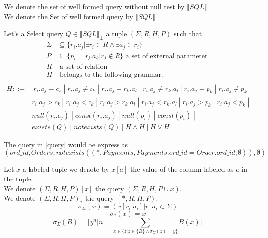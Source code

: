 \begin{mydef}
	We denote the set of well formed query without null test by $\llbracket SQL\rrbracket$
	\\We denote the Set of well formed query by $\llbracket SQL\rrbracket _\bot$
\end{mydef}

\begin{mydef}
	Let's a Select query $Q \in \llbracket SQL\rrbracket _\bot$ a tuple $(\Sigma,R,H,P)$ such that
	\begin{align*}
		\Sigma & \subseteq \{r_i.a_j | \exists r_i \in R \land \exists a_j \in r_i \} \\
		P & \subseteq \{p_i = r_j.a_k | r_j \notin R\} \mbox{ a set of external parameter.}\\
		R & \mbox{ a set of relation}\\
		H &  \mbox{ belongs to the following grammar.}\\
	\end{align*}
	\begin{align*}
		H ::= &\ r_i.a_j = c_k \; |\; r_i.a_j \neq c_k \; |\; r_i.a_j = r_k.a_l \; |\;  r_i.a_j \neq r_k.a_l \;  |\; r_i.a_j = p_k\; |\; r_i.a_j \neq p_k\; |\; 
		\\ & r_i.a_j > c_k \; |\; r_i.a_j < c_k \; |\; r_i.a_j > r_k.a_l \; |\;  r_i.a_j < r_k.a_l \;  |\; r_i.a_j > p_k\; |\; r_i.a_j < p_k\; |\;
		\\ & null(r_i.a_j) \; |\; const(r_i.a_j) \; |\; null(p_i) \; |\;  const(p_i) \;  |\; 
		\\ &  exists(Q) \; |\; notexists(Q) \; |\;  H\land H \; |\; H \lor H 
	\end{align*}
	
\end{mydef}

The query in \ref{query} would be express as $$\left( ord\_id,Orders,notexists((*,Payments,Payments.ord\_id = Order.ord\_id,\emptyset )),\emptyset \right)$$

\begin{mydef}
	Let $x$ a labeled-tuple we denote by  $x[a]$ the value of the column labeled as $a$ in the tuple.
	\\We denote $(\Sigma,R,H,P)[x]$ the query $(\Sigma,R,H,P\cup x)$.
	\\We denote $(\Sigma,R,H,P)_*$ the query $(*,R,H,P)$.
	$$ \sigma_{\Sigma}(x) = (x[r_i.a_i] | r_i.a_i \in \Sigma) $$
	$$ \sigma_{*}(x) = x $$
	$$ \sigma_{\Sigma}(B) = \llbracket y^n | n = \sum_{x \in \{ z | z \in \{B\} \land \sigma_{\Sigma}(z) = y \} } B(x) \rrbracket $$
\end{mydef}


